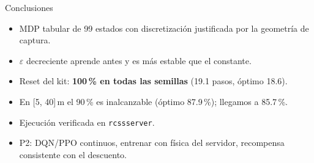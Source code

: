 \documentclass[10pt]{beamer}
\begin{document}
\begin{frame}{Conclusiones}
    \begin{itemize}
        \item MDP tabular de 99 estados con discretización justificada por la geometría de captura.
        \item $\varepsilon$ decreciente aprende antes y es más estable que el constante.
        \item Reset del kit: \textbf{100\,\% en todas las semillas} (19.1 pasos, óptimo 18.6).
        \item En [5, 40]\,m el 90\,\% es inalcanzable (óptimo 87.9\,\%); llegamos a 85.7\,\%.
        \item Ejecución verificada en \texttt{rcssserver}.
        \item P2: DQN/PPO continuos, entrenar con física del servidor, recompensa consistente con el descuento.
    \end{itemize}
\end{frame}
\end{document}
